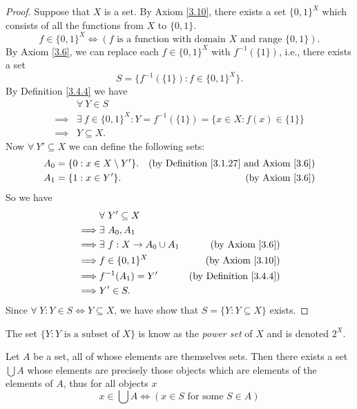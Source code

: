 \begin{proof}
Suppose that \(X\) is a set.
By Axiom \ref{3.10}, there exists a set \(\{0, 1\}^X\) which consists of all the functions from \(X\) to \(\{0, 1\}\).
\[
    f \in \{0, 1\}^X \iff (f \text{ is a function with domain } X \text{ and range } \{0, 1\}).
\]
By Axiom \ref{3.6}, we can replace each \(f \in \{0, 1\}^X\) with \(f^{-1}(\{1\})\), i.e., there exists a set
\[
    S = \{f^{-1}(\{1\}) : f \in \{0, 1\}^X\}.
\]
By Definition \ref{3.4.4} we have
\begin{align*}
& \forall\ Y \in S \\
\implies & \exists\ f \in \{0, 1\}^X : Y = f^{-1}(\{1\}) = \{x \in X : f(x) \in \{1\}\} \\
\implies & Y \subseteq X.
\end{align*}
Now \(\forall\ Y' \subseteq X\) we can define the following sets:
\begin{align*}
A_0 &= \{0 : x \in X \setminus Y'\}. & \text{(by Definition \ref{3.1.27} and Axiom \ref{3.6})} \\
A_1 &= \{1 : x \in Y'\}. & \text{(by Axiom \ref{3.6})}
\end{align*}
So we have
\begin{align*}
& \forall\ Y' \subseteq X \\
\implies & \exists\ A_0, A_1 \\
\implies & \exists\ f : X \to A_0 \cup A_1 & \text{(by Axiom \ref{3.6})} \\
\implies & f \in \{0, 1\}^X & \text{(by Axiom \ref{3.10})} \\
\implies & f^{-1}(A_1) = Y' & \text{(by Definition \ref{3.4.4})} \\
\implies & Y' \in S.
\end{align*}
Since \(\forall\ Y : Y \in S \iff Y \subseteq X\), we have show that \(S = \{Y : Y \subseteq X\}\) exists.
\end{proof}

\begin{remark}\label{3.4.10}
The set \(\{Y : Y \text{ is a subset of } X\}\) is know as the \emph{power set} of \(X\) and is denoted \(2^X\).
\end{remark}

\begin{axiom}[Union]\label{3.11}
Let \(A\) be a set, all of whose elements are themselves sets.
Then there exists a set \(\bigcup A\) whose elements are precisely those objects which are elements of the elements of \(A\), thus for all objects \(x\)
\[
    x \in \bigcup A \iff (x \in S \text{ for some } S \in A)
\]
\end{axiom}

